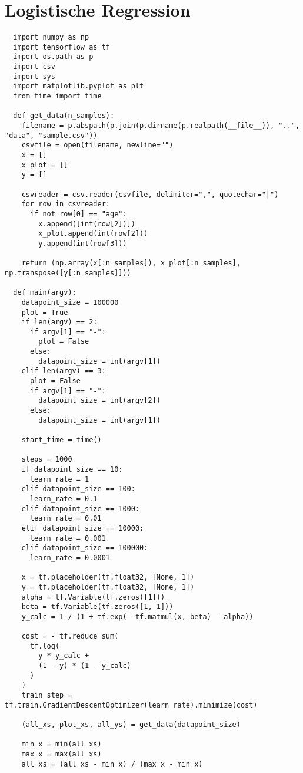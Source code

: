 \section{Logistische Regression}

\begin{verbatim}
  import numpy as np
  import tensorflow as tf
  import os.path as p
  import csv
  import sys
  import matplotlib.pyplot as plt
  from time import time

  def get_data(n_samples):
    filename = p.abspath(p.join(p.dirname(p.realpath(__file__)), "..", "data", "sample.csv"))
    csvfile = open(filename, newline="")
    x = []
    x_plot = []
    y = []

    csvreader = csv.reader(csvfile, delimiter=",", quotechar="|")
    for row in csvreader:
      if not row[0] == "age":
        x.append([int(row[2])])
        x_plot.append(int(row[2]))
        y.append(int(row[3]))

    return (np.array(x[:n_samples]), x_plot[:n_samples], np.transpose([y[:n_samples]]))

  def main(argv):
    datapoint_size = 100000
    plot = True
    if len(argv) == 2:
      if argv[1] == "-":
        plot = False
      else:
        datapoint_size = int(argv[1])
    elif len(argv) == 3:
      plot = False
      if argv[1] == "-":
        datapoint_size = int(argv[2])
      else:
        datapoint_size = int(argv[1])

    start_time = time()

    steps = 1000
    if datapoint_size == 10:
      learn_rate = 1
    elif datapoint_size == 100:
      learn_rate = 0.1
    elif datapoint_size == 1000:
      learn_rate = 0.01
    elif datapoint_size == 10000:
      learn_rate = 0.001
    elif datapoint_size == 100000:
      learn_rate = 0.0001

    x = tf.placeholder(tf.float32, [None, 1])
    y = tf.placeholder(tf.float32, [None, 1])
    alpha = tf.Variable(tf.zeros([1]))
    beta = tf.Variable(tf.zeros([1, 1]))
    y_calc = 1 / (1 + tf.exp(- tf.matmul(x, beta) - alpha))

    cost = - tf.reduce_sum(
      tf.log(
        y * y_calc +
        (1 - y) * (1 - y_calc)
      )
    )
    train_step = tf.train.GradientDescentOptimizer(learn_rate).minimize(cost)

    (all_xs, plot_xs, all_ys) = get_data(datapoint_size)

    min_x = min(all_xs)
    max_x = max(all_xs)
    all_xs = (all_xs - min_x) / (max_x - min_x)


\end{verbatim}

